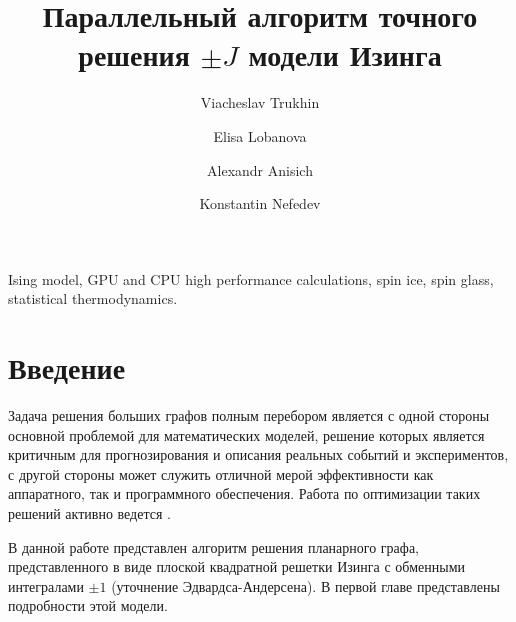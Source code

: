 \documentclass[utf8, babel, sor, jor, amsmath, amssymb, reprint]{elsarticle} %
\begin{document}
	
	\begin{frontmatter}
		
		
		\title{Параллельный алгоритм точного решения $\pm J$ модели Изинга}
		
		\author[mainaddress, secondaryaddress]{Viacheslav Trukhin}
		
			\author[mainaddress, secondaryaddress]{Elisa Lobanova}
		
		\author[mainaddress, secondaryaddress]{Alexandr Anisich}
		
		\author[mainaddress, secondaryaddress]{Konstantin Nefedev}
		
		\address[mainaddress]{Far Eastern Federal University, Vladivostok, Russky Island, 10 Ajax Bay, 690922, the Russian Federation}
		\address[secondaryaddress]{Institute of Applied Mathematics, Far Eastern Branch, Russian Academy of Science, Vladivostok, Radio 7, 690041, the Russian Federation}
		
		\begin{abstract}
			
			
		\end{abstract}
		
		
		\begin{keyword}
			Ising model, GPU and CPU high performance calculations, spin ice, spin glass, statistical thermodynamics.
			
		\end{keyword}
		
		
	\end{frontmatter}
	
	\linenumbers
	\newpage
	\tableofcontents
	
	\newpage
	\section*{Введение}
	
	Задача решения больших графов полным перебором является с одной стороны основной проблемой для математических моделей, решение которых является критичным для прогнозирования и описания реальных событий и экспериментов, с другой стороны может служить отличной мерой эффективности как аппаратного, так и программного обеспечения. Работа по оптимизации таких решений активно ведется \cite{romero2020high}. 
	
	В данной работе представлен алгоритм решения планарного графа, представленного в виде плоской квадратной решетки Изинга с обменными интегралами $\pm 1$ (уточнение Эдвардса-Андерсена). В первой главе представлены подробности этой модели.
	
\end{document}
